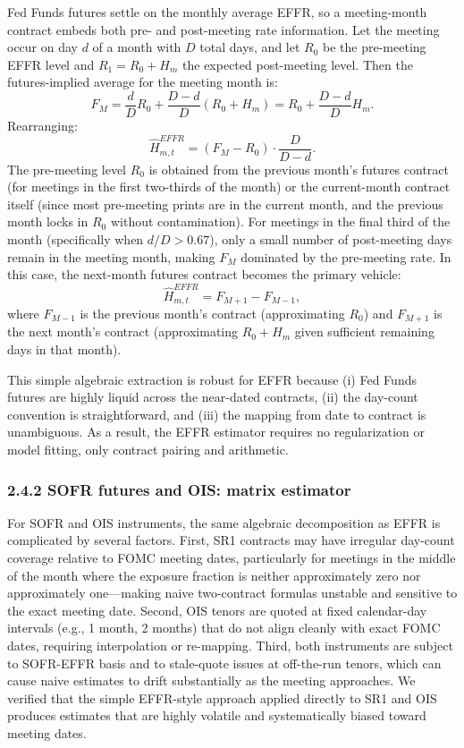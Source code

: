 Fed Funds futures settle on the monthly average EFFR, so a meeting-month contract embeds both pre- and post-meeting rate information. Let the meeting occur on day $d$ of a month with $D$ total days, and let $R_0$ be the pre-meeting EFFR level and $R_1 = R_0 + H_m$ the expected post-meeting level. Then the futures-implied average for the meeting month is:
\[
F_M = \frac{d}{D} R_0 + \frac{D-d}{D}(R_0 + H_m) = R_0 + \frac{D-d}{D} H_m.
\]
Rearranging:
\[
\widehat{H}^{EFFR}_{m,t} = (F_M - R_0) \cdot \frac{D}{D-d}.
\]
The pre-meeting level $R_0$ is obtained from the previous month's futures contract (for meetings in the first two-thirds of the month) or the current-month contract itself (since most pre-meeting prints are in the current month, and the previous month locks in $R_0$ without contamination). For meetings in the final third of the month (specifically when $d/D > 0.67$), only a small number of post-meeting days remain in the meeting month, making $F_M$ dominated by the pre-meeting rate. In this case, the next-month futures contract becomes the primary vehicle:
\[
\widehat{H}^{EFFR}_{m,t} = F_{M+1} - F_{M-1},
\]
where $F_{M-1}$ is the previous month's contract (approximating $R_0$) and $F_{M+1}$ is the next month's contract (approximating $R_0 + H_m$ given sufficient remaining days in that month).

This simple algebraic extraction is robust for EFFR because (i) Fed Funds futures are highly liquid across the near-dated contracts, (ii) the day-count convention is straightforward, and (iii) the mapping from date to contract is unambiguous. As a result, the EFFR estimator requires no regularization or model fitting, only contract pairing and arithmetic.

\subsubsection*{2.4.2 SOFR futures and OIS: matrix estimator}

For SOFR and OIS instruments, the same algebraic decomposition as EFFR is complicated by several factors. First, SR1 contracts may have irregular day-count coverage relative to FOMC meeting dates, particularly for meetings in the middle of the month where the exposure fraction is neither approximately zero nor approximately one---making naive two-contract formulas unstable and sensitive to the exact meeting date. Second, OIS tenors are quoted at fixed calendar-day intervals (e.g., 1 month, 2 months) that do not align cleanly with exact FOMC dates, requiring interpolation or re-mapping. Third, both instruments are subject to SOFR-EFFR basis and to stale-quote issues at off-the-run tenors, which can cause naive estimates to drift substantially as the meeting approaches. We verified that the simple EFFR-style approach applied directly to SR1 and OIS produces estimates that are highly volatile and systematically biased toward meeting dates.

